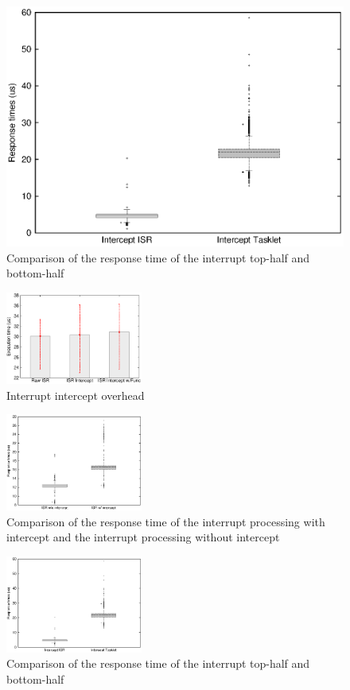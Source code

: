 \begin{figure}[!t]
\begin{minipage}{0.33\hsize}
\begin{center}
\includegraphics[width=0.33\hsize]{img/tasklet_vs_interrupt}
\caption{Comparison of the response time of the interrupt top-half and bottom-half}
\label{fig:bottomvstasklet}
\end{center}
\end{minipage}
\end{figure}
\fi


\begin{figure}[t]
\begin{center}
\includegraphics[width=0.4\textwidth]{img/interrupt}
\caption{Interrupt intercept overhead}
\label{fig:irq_overhead}
\end{center}
\end{figure}
\begin{figure}[t]
\begin{center}
\includegraphics[width=0.4\textwidth]{img/interrupt_response}
\caption{Comparison of the response time of the interrupt processing with intercept and the interrupt processing without intercept}
\label{fig:response}
\end{center}
\end{figure}
\begin{figure}[t]
\begin{center}
\includegraphics[width=0.4\textwidth]{img/tasklet_vs_interrupt}
\caption{Comparison of the response time of the interrupt top-half and bottom-half}
\label{fig:bottomvstasklet}
\end{center}
\end{figure}

